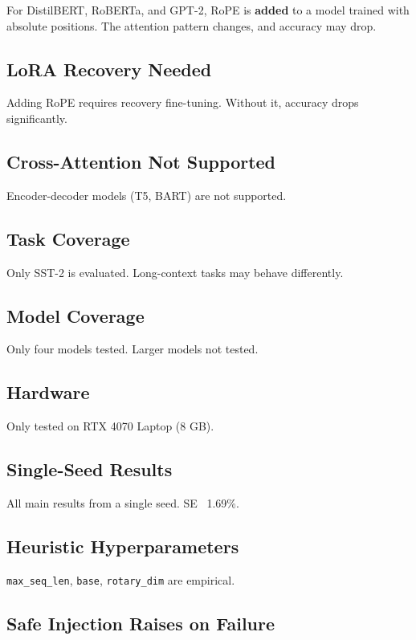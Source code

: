 For DistilBERT, RoBERTa, and GPT-2, RoPE is \textbf{added} to a model trained 
with absolute positions. The attention pattern changes, and accuracy may 
drop.

\subsection{LoRA Recovery Needed}

Adding RoPE requires recovery fine-tuning. Without it, accuracy drops 
significantly.

\subsection{Cross-Attention Not Supported}

Encoder-decoder models (T5, BART) are not supported.

\subsection{Task Coverage}

Only SST-2 is evaluated. Long-context tasks may behave differently.

\subsection{Model Coverage}

Only four models tested. Larger models not tested.

\subsection{Hardware}

Only tested on RTX 4070 Laptop (8 GB).

\subsection{Single-Seed Results}

All main results from a single seed. SE ~1.69\%.

\subsection{Heuristic Hyperparameters}

\texttt{max\_seq\_len}, \texttt{base}, \texttt{rotary\_dim} are empirical.

\subsection{Safe Injection Raises on Failure}

